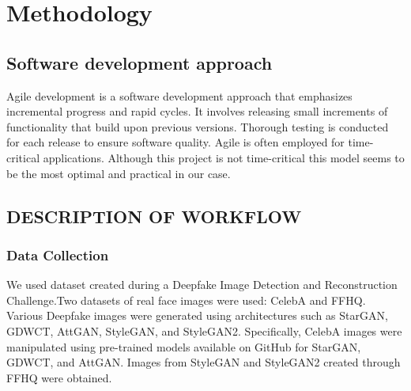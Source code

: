     \chapter{Methodology}
       \section{Software development approach}
        Agile development is a software development approach that emphasizes incremental progress and rapid cycles. It involves releasing small increments of functionality that build upon previous versions. Thorough testing is conducted for each release to ensure software quality. Agile is often employed for time-critical applications. Although this project is not time-critical this model seems to be the most optimal and practical in our case.
        \begin{figure}[hbt!]
        \end{figure}
        \section{DESCRIPTION OF WORKFLOW}
        \subsection{Data Collection}
        We used dataset created during a Deepfake Image Detection and Reconstruction Challenge.Two datasets of real face images were used: CelebA and FFHQ. Various Deepfake images were generated using architectures such as StarGAN, GDWCT, AttGAN, StyleGAN, and StyleGAN2. Specifically, CelebA images were manipulated using pre-trained models available on GitHub for StarGAN, GDWCT, and AttGAN. Images from StyleGAN and StyleGAN2 created through FFHQ were obtained.
        
